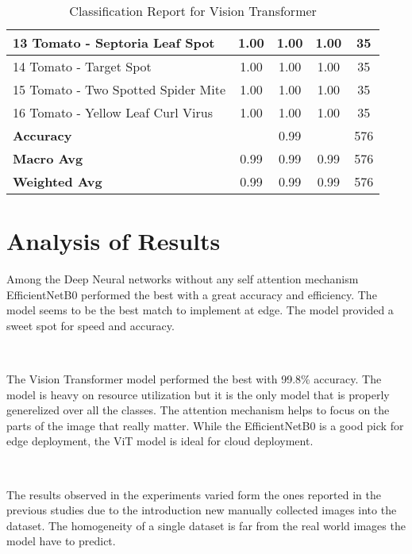 \begin{table}[h!]
{\begin{tabular}{|l|c|c|c|c|}
    13 Tomato - Septoria Leaf Spot                    & 1.00               & 1.00            & 1.00              & 35               \\ \hline
    14 Tomato - Target Spot                           & 1.00               & 1.00            & 1.00              & 35               \\ \hline
    15 Tomato - Two Spotted Spider Mite               & 1.00               & 1.00            & 1.00              & 35               \\ \hline
    16 Tomato - Yellow Leaf Curl Virus                & 1.00               & 1.00            & 1.00              & 35               \\ \hline
    \textbf{Accuracy}                                 & \multicolumn{3}{c|}{0.99}            & 576              \\ \hline
    \textbf{Macro Avg}                                & 0.99               & 0.99            & 0.99              & 576              \\ \hline
    \textbf{Weighted Avg}                             & 0.99               & 0.99            & 0.99              & 576              \\ \hline
    \end{tabular}%
    }
    \caption{Classification Report for Vision Transformer}
    \label{tab:classification_report}
\end{table}


\section{ Analysis of Results}

Among the Deep Neural networks without any self attention mechanism EfficientNetB0 performed the best with a great accuracy and efficiency. The model seems to be the best match to implement at edge. The model provided a sweet spot for speed and accuracy.

\

The Vision Transformer model performed the best with 99.8\% accuracy. The model is heavy on resource utilization but it is the only model that is properly generelized over all the classes. The attention mechanism helps to focus on the parts of the image that really matter. While the EfficientNetB0 is a good pick for edge deployment, the ViT model is ideal for cloud deployment.

\

The results observed in the experiments varied form the ones reported in the previous studies due to the introduction new manually collected images into the dataset. The homogeneity of a single dataset is far from the real world images the model have to predict.

